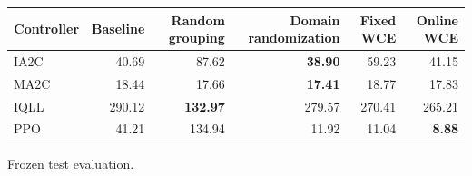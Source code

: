 \begin{tabular}{lrrrrr}
\hline
Controller & Baseline & Random grouping & Domain randomization & Fixed WCE & Online WCE \\
\hline
IA2C & 40.69 & 87.62 & \textbf{38.90} & 59.23 & 41.15 \\
MA2C & 18.44 & 17.66 & \textbf{17.41} & 18.77 & 17.83 \\
IQLL & 290.12 & \textbf{132.97} & 279.57 & 270.41 & 265.21 \\
PPO & 41.21 & 134.94 & 11.92 & 11.04 & \textbf{8.88} \\
\hline
\end{tabular}
Frozen test evaluation.
